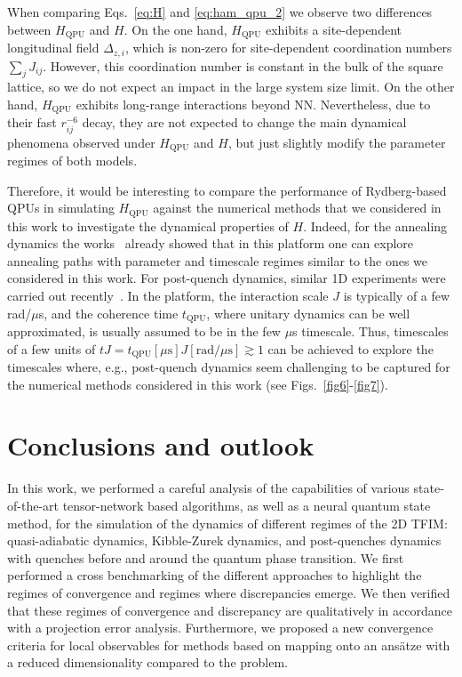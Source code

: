 \documentclass[aps,pra,reprint,amssymb,superscriptaddress]{revtex4-2}
\begin{document}
When comparing Eqs.~\eqref{eq:H} and \eqref{eq:ham_qpu_2} we observe two differences between $H_\text{QPU}$ and $H$. On the one hand, $H_\text{QPU}$ exhibits a site-dependent longitudinal field $\Delta_{z,i}$, which is non-zero for site-dependent coordination numbers $\sum_{j}J_{ij}$. However, this coordination number is constant in the bulk of the square lattice, so we do not expect an impact in the large system size limit. On the other hand, $H_\text{QPU}$ exhibits long-range interactions beyond NN. Nevertheless, due to their fast $r_{ij}^{-6}$ decay, they are not expected to change the main dynamical phenomena observed under $H_\text{QPU}$ and $H$, but just slightly modify the parameter regimes of both models.

Therefore, it would be interesting to compare the performance of Rydberg-based QPUs in simulating $H_\text{QPU}$ against the numerical methods that we considered in this work to investigate the dynamical properties of $H$. Indeed, for the annealing dynamics the works~\cite{scholl_quantum_2021, scholl_quantum_2021-1, ebadi_quantum_2022} already showed that in this platform one can explore annealing paths with parameter and timescale regimes similar to the ones we considered in this work. For post-quench dynamics, similar 1D experiments were carried out recently~\cite{shaw_benchmarking_2024, choi_preparing_2023}. In the platform, the interaction scale $J$ is typically of a few rad/$\mu$s, and the coherence time $t_{\text{QPU}}$, where unitary dynamics can be well approximated, is usually assumed to be in the few $\mu$s timescale. Thus, timescales of a few units of $tJ= t_{\text{QPU}}[\mu\text{s}]J[\text{rad}/\mu\text{s}]\gtrsim 1$ can be achieved to explore the timescales where, e.g., post-quench dynamics seem challenging to be captured for the numerical methods considered in this work (see Figs.~\ref{fig6}-\ref{fig7}).


\section{\label{sec8} Conclusions and outlook}


In this work, we performed a careful analysis of the capabilities of various state-of-the-art tensor-network based algorithms, as well as a neural quantum state method, for the simulation of the dynamics of different regimes of the 2D TFIM: quasi-adiabatic dynamics, Kibble-Zurek dynamics, and post-quenches dynamics with quenches before and around the quantum phase transition.
We first performed a cross benchmarking of the different approaches to highlight the regimes of convergence and regimes where discrepancies emerge. We then verified that these regimes of convergence and discrepancy are qualitatively in accordance with a projection error analysis. Furthermore, we proposed a new convergence criteria for local observables for methods based on mapping onto an ansätze with a reduced dimensionality compared to the problem.
\end{document}
